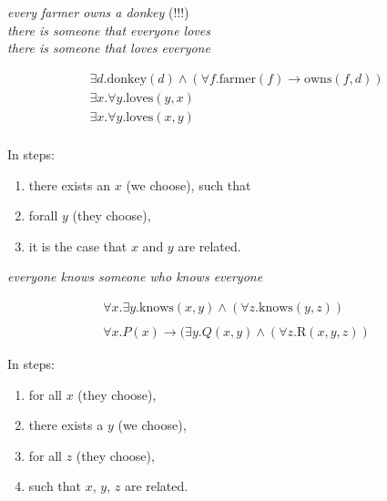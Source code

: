 \documentclass[xetex,aspectratio=169,14pt,hyperref={pdfpagelabels=true,pdflang={en-GB}}]{beamer}
\begin{document}
\begin{frame}[t]

  \begin{center}
    \emph{every farmer owns a donkey} (!!!) \\
    \emph{there is someone that everyone loves} \\
    \emph{there is someone that loves everyone} \\
  \end{center}

  \begin{displaymath}
    \begin{array}{c}
      \exists d. \mathrm{donkey}(d) \land (\forall f. \mathrm{farmer}(f) \to \mathrm{owns}(f,d))\\
      \exists x. \forall y. \mathrm{loves}(y, x) \\
      \exists x. \forall y. \mathrm{loves}(x, y) \\
    \end{array}
  \end{displaymath}

  In steps:
  \begin{enumerate}
  \item there exists an $x$ (we choose), such that
  \item forall $y$ (they choose),
  \item it is the case that $x$ and $y$ are related.
  \end{enumerate}
\end{frame}

\begin{frame}[t]

  \begin{center}
    \emph{everyone knows someone who knows everyone}
  \end{center}

  \begin{displaymath}
    \begin{array}{c}
      \forall x. \exists y. \mathrm{knows}(x,y) \land (\forall z. \mathrm{knows}(y,z)) \\
      \\
      \forall x. P(x) \to (\exists y. Q(x,y) \land (\forall z. \mathrm{R}(x,y,z))
    \end{array}
  \end{displaymath}

  In steps:
  \begin{enumerate}
  \item for all $x$ (they choose),
  \item there exists a $y$ (we choose),
  \item for all $z$ (they choose),
  \item such that $x$, $y$, $z$ are related.
  \end{enumerate}
\end{frame}
\end{document}
